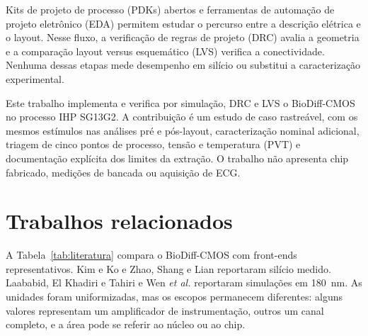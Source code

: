 \documentclass[conference]{IEEEtran}
\begin{document}
Kits de projeto de processo (PDKs) abertos e ferramentas de automação de projeto eletrônico (EDA) permitem estudar o percurso entre a descrição elétrica e o layout. Nesse fluxo, a verificação de regras de projeto (DRC) avalia a geometria e a comparação layout versus esquemático (LVS) verifica a conectividade. Nenhuma dessas etapas mede desempenho em silício ou substitui a caracterização experimental.

Este trabalho implementa e verifica por simulação, DRC e LVS o BioDiff-CMOS no processo IHP SG13G2. A contribuição é um estudo de caso rastreável, com os mesmos estímulos nas análises pré e pós-layout, caracterização nominal adicional, triagem de cinco pontos de processo, tensão e temperatura (PVT) e documentação explícita dos limites da extração. O trabalho não apresenta chip fabricado, medições de bancada ou aquisição de ECG.

\section{Trabalhos relacionados}

A Tabela~\ref{tab:literatura} compara o BioDiff-CMOS com front-ends representativos. Kim e Ko \cite{kim2016} e Zhao, Shang e Lian \cite{zhao2019} reportaram silício medido. Laababid, El Khadiri e Tahiri \cite{laababid2022} e Wen \emph{et al.} \cite{wen2025} reportaram simulações em 180~nm. As unidades foram uniformizadas, mas os escopos permanecem diferentes: alguns valores representam um amplificador de instrumentação, outros um canal completo, e a área pode se referir ao núcleo ou ao chip.
\end{document}
